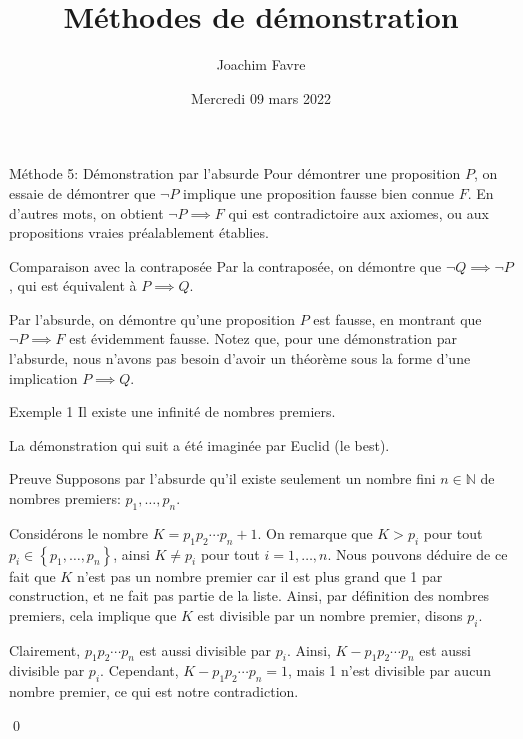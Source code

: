 \documentclass[a4paper]{article}
\title{Méthodes de démonstration}
\author{Joachim Favre}
\date{Mercredi 09 mars 2022}
\begin{document}
\maketitle


\begin{parag}{Méthode 5: Démonstration par l'absurde}
    Pour démontrer une proposition $P$, on essaie de démontrer que $\lnot P$ implique une proposition fausse bien connue $F$. En d'autres mots, on obtient $\lnot P \implies F$ qui est contradictoire aux axiomes, ou aux propositions vraies préalablement établies.

    \begin{subparag}{Comparaison avec la contraposée}
        Par la contraposée, on démontre que $\lnot Q \implies \lnot P$, qui est équivalent à $P \implies Q$.

        Par l'absurde, on démontre qu'une proposition $P$ est fausse, en montrant que $\lnot P \implies F$ est évidemment fausse. Notez que, pour une démonstration par l'absurde, nous n'avons pas besoin d'avoir un théorème sous la forme d'une implication $P \implies Q$.
    \end{subparag}
    
\end{parag}

\begin{parag}{Exemple 1}
    Il existe une infinité de nombres premiers.

    La démonstration qui suit a été imaginée par Euclid (le best).

    \begin{subparag}{Preuve}
        Supposons par l'absurde qu'il existe seulement un nombre fini $n \in \mathbb{N}$ de nombres premiers: $p_1, \ldots, p_n$. 

        Considérons le nombre $K = p_1 p_2 \cdots p_n + 1$. On remarque que $K > p_i$ pour tout $p_i \in \left\{p_1, \ldots, p_n\right\}$, ainsi $K \neq p_i$ pour tout $i = 1, \ldots, n$. Nous pouvons déduire de ce fait que $K$ n'est pas un nombre premier car il est plus grand que 1 par construction, et ne fait pas partie de la liste. Ainsi, par définition des nombres premiers, cela implique que $K$ est divisible par un nombre premier, disons $p_i$.

        Clairement, $p_1 p_2 \cdots p_n$ est aussi divisible par $p_i$. Ainsi, $K - p_1 p_2 \cdots p_n$ est aussi divisible par $p_i$. Cependant, $K - p_1 p_2 \cdots p_n = 1$, mais 1 n'est divisible par aucun nombre premier, ce qui est notre contradiction.

        \qed
    \end{subparag}
\end{parag}
\end{document}
